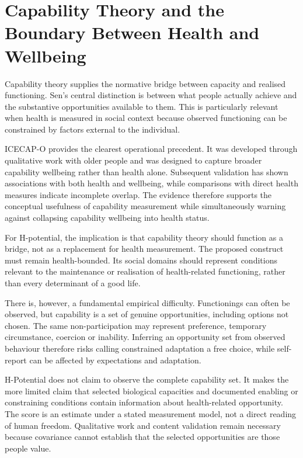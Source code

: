 \section{Capability Theory and the Boundary Between Health and Wellbeing}

Capability theory supplies the normative bridge between capacity and realised functioning. Sen's central distinction is between what people actually achieve and the substantive opportunities available to them. \cite{sen_1993} This is particularly relevant when health is measured in social context because observed functioning can be constrained by factors external to the individual.

ICECAP-O provides the clearest operational precedent. It was developed through qualitative work with older people and was designed to capture broader capability wellbeing rather than health alone. \cite{icecap_o} Subsequent validation has shown associations with both health and wellbeing, while comparisons with direct health measures indicate incomplete overlap. \cite{icecap_o_validation} The evidence therefore supports the conceptual usefulness of capability measurement while simultaneously warning against collapsing capability wellbeing into health status.

For H-potential, the implication is that capability theory should function as a bridge, not as a replacement for health measurement. The proposed construct must remain health-bounded. Its social domains should represent conditions relevant to the maintenance or realisation of health-related functioning, rather than every determinant of a good life.

There is, however, a fundamental empirical difficulty. Functionings can often
be observed, but capability is a set of genuine opportunities, including options
not chosen. The same non-participation may represent preference, temporary
circumstance, coercion or inability. Inferring an opportunity set from observed
behaviour therefore risks calling constrained adaptation a free choice, while
self-report can be affected by expectations and adaptation. \cite{cookson_2005}

H-Potential does not claim to observe the complete capability set. It makes the
more limited claim that selected biological capacities and documented enabling
or constraining conditions contain information about health-related opportunity.
The score is an estimate under a stated measurement model, not a direct reading
of human freedom. Qualitative work and content validation remain necessary
because covariance cannot establish that the selected opportunities are those
people value.

